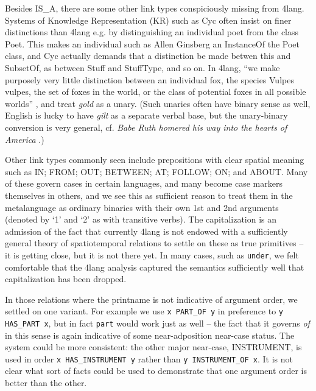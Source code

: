 \documentclass[11pt,bookmarks,bookmarksnumbered,naturalnames,plainpages=false,pdftex,colorlinks=true,urlcolor=blue,bookmarksdepth=subsection,plainpages=false]{paper}
\begin{document}
Besides IS\_A, there are some other link types conspiciously missing from
4lang. Systems of Knowledge Representation (KR) such as Cyc \citep{Lenat:1990}
often insist on finer distinctions than 4lang e.g. by distinguishing an
individual poet from the class Poet. This makes an individual such as Allen
Ginsberg an {\sc InstanceOf} the Poet class, and Cyc actually demands that a
distinction be made betwen this and {\sc SubsetOf}, as between {\sc Stuff} and
{\sc StuffType}, and so on. In 4lang, ``we make purposely very little
distinction between an individual fox, the species Vulpes vulpes, the set of
foxes in the world, or the class of potential foxes in all possible worlds''
\citep{Kornai:2018}, and treat {\it gold} as a unary. (Such unaries often have
binary sense as well, English is lucky to have {\it gilt} as a separate verbal
base, but the unary-binary conversion is very general, cf. {\it Babe Ruth
  homered his way into the hearts of America} \citep{Jackendoff:1990}.)

Other link types commonly seen include prepositions with clear spatial meaning
such as IN; FROM; OUT; BETWEEN; AT; FOLLOW; ON; and ABOUT. Many of these
govern cases in certain languages, and many become case markers themselves in
others, and we see this as sufficient reason to treat them in the metalanguage
as ordinary binaries with their own 1st and 2nd arguments (denoted by `1' and
`2' as with transitive verbs). The capitalization is an admission of the fact
that currently 4lang is not endowed with a sufficiently general theory of
spatiotemporal relations to settle on these as true primitives -- it is
getting close, but it is not there yet. In many cases, such as {\tt under}, we
felt comfortable that the 4lang analysis captured the semantics sufficiently
well that capitalization has been dropped.

In those relations where the printname is not indicative of argument order, we
settled on one variant. For example we use {\tt x PART\_OF y} in preference to
{\tt y HAS\_PART x}, but in fact {\tt part} would work just as well -- the
fact that it governs {\it of} in this sense is again indicative of some
near-adposition near-case status. The system could be more consistent: the
other major near-case, INSTRUMENT, is used in order {\tt x HAS\_INSTRUMENT y}
rather than {\tt y INSTRUMENT\_OF x}. It is not clear what sort of facts could
be used to demonstrate that one argument order is better than the other.
\end{document}
